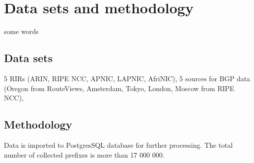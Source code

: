 \section{Data sets and methodology}
\label{sec:data sets}

some words

\subsection{Data sets}

5 RIRs (ARIN, RIPE NCC, APNIC, LAPNIC, AfriNIC), 5 sources for BGP data (Oregon from RouteViews, Amsterdam, Tokyo, London, Moscow from RIPE NCC),


\subsection{Methodology}

Data is imported to PostgresSQL database for further processing. The total number of collected prefixes is more than 17 000 000.